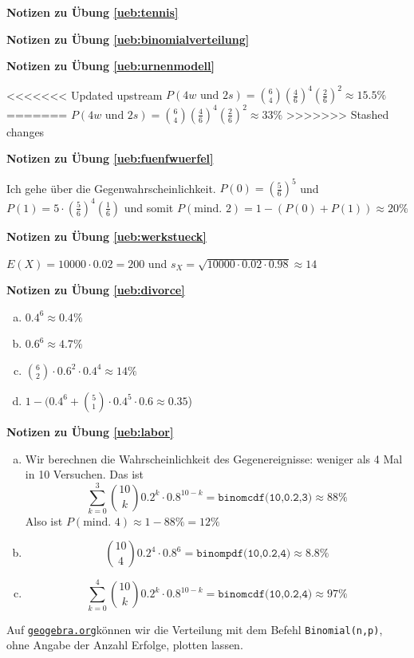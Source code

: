 \documentclass[%
<<<<<<< Updated upstream
<<<<<<< Updated upstream
11pt,%
twoside,%
titlepage,%
german,%
=======
=======
>>>>>>> Stashed changes
11pt,%
twoside,%
titlepage,%
swissgerman,%
<<<<<<< Updated upstream
>>>>>>> Stashed changes
=======
>>>>>>> Stashed changes
headsepline%
]{scrartcl}
\newcommand{\faReturnGray}{\textcolor{gray}{\faMailReply}} %
\newcommand{\geogebralink}{\href{https://www.geogebra.org/calculator}{\texttt{geogebra.org}}}
\newcommand{\geogebralink}{\href{https://www.geogebra.org/calculator}{\texttt{geogebra.org}}}
\theoremstyle{definition}
\theoremstyle{plain}
\newcommand{\concatueb}[1]{ueb:#1}%
\newcommand{\concatlsg}[1]{lsg:#1}%
\newenvironment{lsg}[1]{%
    \par\noindent\textbf{Notizen zu Übung \ref{\concatueb{#1}}}\label{\concatlsg{#1}}
    \hfill\hyperref[\concatueb{#1}]{\faReturnGray}\par %
}{%
    \par%
}
\newcommand{\concatueb}[1]{ueb:#1}%
\newcommand{\concatlsg}[1]{lsg:#1}%
\newenvironment{lsg}[1]{%
    \par\noindent\textbf{Notizen zu Übung \ref{\concatueb{#1}}.}%
    \label{\concatlsg{#1}}
}{%
    \par%
}
\begin{document}
\begin{lsg}{tennis}
\begin{lsg}{binomialverteilung}

\end{lsg}
\begin{lsg}{urnenmodell}
<<<<<<< Updated upstream
    $P(4w\text{ und }2s)=\binom{6}{4}(\frac{4}{6})^4(\frac{2}{6})^2\approx15.5\%$
=======
    $P(4w\text{ und }2s)=\binom{6}{4}(\frac{4}{6})^4(\frac{2}{6})^2\approx33\%$
>>>>>>> Stashed changes
\end{lsg}
\begin{lsg}{fuenfwuerfel}
    Ich gehe über die Gegenwahrscheinlichkeit. $P(0)=(\frac{5}{6})^5$ und $P(1)=5\cdot(\frac{5}{6})^4(\frac{1}{6})$ und somit $P(\text{mind. }2)=1-(P(0)+P(1))\approx20\%$
\end{lsg}
\begin{lsg}{werkstueck}
    $E(X)=10000\cdot0.02=200$ und $s_X=\sqrt{10000\cdot0.02\cdot0.98}\approx14$
\end{lsg}
\begin{lsg}{divorce}
    \begin{enumerate}[a)]
        \item $0.4^6\approx0.4\%$
        \item $0.6^6\approx4.7\%$
        \item $\binom{6}{2}\cdot0.6^2\cdot0.4^4\approx14\%$
        \item $1-(0.4^6+\binom{5}{1}\cdot0.4^5\cdot0.6\approx0.35$)
    \end{enumerate}
\end{lsg}
\begin{lsg}{labor}
    \begin{enumerate}[a)]
        \item Wir berechnen die Wahrscheinlichkeit des Gegenereignisse: weniger als 4 Mal in 10 Versuchen. Das ist
        $$\sum_{k=0}^3\binom{10}{k}0.2^k\cdot0.8^{10-k}=\texttt{binomcdf(10,0.2,3)}\approx88\%$$
        Also ist $P(\text{mind. 4})\approx1-88\%=12\%$
        \item $$\binom{10}{4}0.2^4\cdot0.8^6=\texttt{binompdf(10,0.2,4)}\approx8.8\%$$
        \item $$\sum_{k=0}^4\binom{10}{k}0.2^k\cdot0.8^{10-k}=\texttt{binomcdf(10,0.2,4)}\approx97\%$$
    \end{enumerate}
    Auf \geogebralink können wir die Verteilung mit dem Befehl \texttt{Binomial(n,p)}, ohne Angabe der Anzahl Erfolge, plotten lassen.

\begin{center}
\begin{tikzpicture}[x=0.8cm, y=12cm] %


\end{tikzpicture}
\end{center}
\end{lsg}
\end{lsg}
\end{document}
